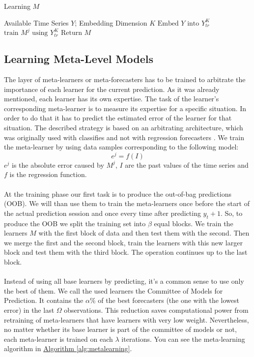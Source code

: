 \documentclass[runningheads,a4paper]{llncs}[2015/06/24]
\begin{document}
\begin{algorithm}[h]

\caption{Learning $M$}\label{alg:learning}
\begin{algorithmic}[1]

\Require Available Time Series $Y$; Embedding Dimension $K$
\State $\text{Embed $Y$ into $Y_{tr}^{K}$}$
\State $\text{train $M^j$ using $Y_{tr}^K$}$
\EndFor
\State $\text{Return $M$}$
\end{algorithmic}
\end{algorithm}

\subsection{Learning Meta-Level Models}
The layer of meta-learners or meta-forecasters has to be trained to arbitrate the importance of each learner for the current prediction. As it was already mentioned, each learner has its own expertise. The task of the learner's corresponding meta-learner is to measure its expertise for a specific situation. In order to do that it has to predict the estimated error of the learner for that situation. The  described strategy is based on an arbitrating architecture, which was originally used with classifies and not with regression forecasters \cite{ortega2001arbitrating}. We train the meta-learner by using data samples corresponding to the following model:\begin{equation}
e^j = f(I)
\end{equation} $e^j$ is the absolute error caused by $M^j$, $I$ are the past values of the time series and $f$ is the regression function.\\\\ At the training phase our first task is to produce the out-of-bag predictions (OOB). We will than use them to train the meta-learners once before the start of the actual prediction session and once every time after predicting $y_t+1$. So, to produce the OOB we split the training set into $\beta$ equal blocks. We train the learners $M$ with the first block of data and then test them with the second. Then we merge the first and the second block, train the learners with this new larger block and test them with the third block. The operation continues up to the last block.\\\\Instead of using all base learners by predicting, it's a common sense to use only the best of them. We call the used learners the Committee of Models for Prediction. It contains the $\alpha$\% of the best forecasters (the one with the lowest error) in the last $\Omega$ observations. This reduction saves computational power from retraining of meta-learners that have learners with very low weight. Nevertheless, no matter whether its base learner is part of the committee of models or not, each meta-learner is trained on each $\lambda$ iterations. You can see the meta-learning algorithm in \hyperref[alg:metalearning]{Algorithm  \ref{alg:metalearning}}.
    
\end{document}

